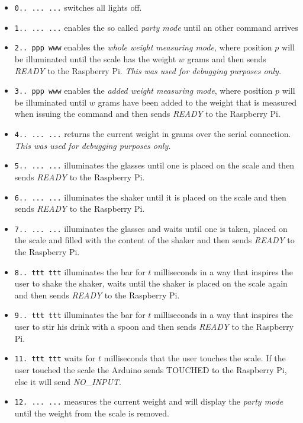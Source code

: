 \documentclass{acm_proc_article-sp}
\begin{document}
\begin{itemize}
\item \texttt{0.. ... ...} switches all lights off.
\item \texttt{1.. ... ...} enables the so called \textit{party mode} until an other command arrives
\item \texttt{2.. ppp www} enables the \textit{whole weight measuring mode}, where position $ p $ will be illuminated until the scale has the weight $w$ grams and then sends \textit{READY} to the Raspberry Pi. \textit{This was used for debugging purposes only.}
\item \texttt{3.. ppp www} enables the \textit{added weight measuring mode}, where position $ p $ will be illuminated until  $w$ grams have been added to the weight that is measured when issuing the command and then sends \textit{READY} to the Raspberry Pi.
\item \texttt{4.. ... ...} returns the current weight in grams over the serial connection. \textit{This was used for debugging purposes only.}
\item \texttt{5.. ... ...} illuminates the glasses until one is placed on the scale and then sends \textit{READY} to the Raspberry Pi.
\item \texttt{6.. ... ...} illuminates the shaker until it is placed on the scale and then sends \textit{READY} to the Raspberry Pi.
\item \texttt{7.. ... ...} illuminates the glasses and waits until one is taken, placed on the scale and filled with the content of the shaker and then sends \textit{READY} to the Raspberry Pi.
\item \texttt{8.. ttt ttt} illuminates the bar  for $t$ milliseconds in a way that inspires the user to shake the shaker, waits until the shaker is placed on the scale again and then sends \textit{READY} to the Raspberry Pi. 
\item \texttt{9.. ttt ttt} illuminates the bar for $t$ milliseconds in a way that inspires the user to stir his drink with a spoon and then sends \textit{READY} to the Raspberry Pi.
\item \texttt{11. ttt ttt} waits for $t$ milliseconds that the user touches the scale. If the user touched the scale the Arduino sends {TOUCHED} to the Raspberry Pi, else it will send \textit{NO\_INPUT}.
\item \texttt{12. ... ...} measures the current weight and will display the \textit{party mode} until the weight from the scale is removed.

\end{itemize}
\end{document}

